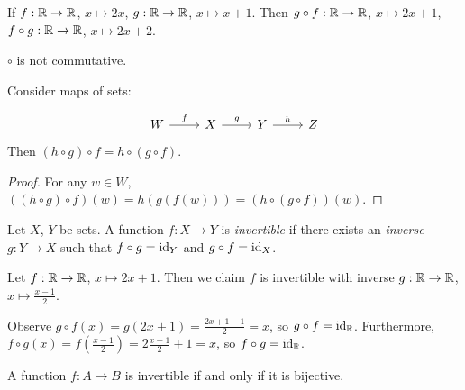 \documentclass{../../template/note}
\begin{document}
    \begin{example}
        If \(f: \mathbb R \to \mathbb R\), \(x \mapsto 2x\), \(g: \mathbb R \to \mathbb R\), \(x \mapsto x+1\). Then \(g \circ f: \mathbb R \to \mathbb R\), \(x \mapsto 2x + 1\), \(f \circ g: \mathbb R \to \mathbb R\), \(x \mapsto 2x + 2\).
    \end{example}
    
    \begin{remark*}
        \(\circ\) is not commutative.
    \end{remark*}
    
    \begin{lemma}
        Consider maps of sets:

        \[\begin{tikzcd}
            W & X & Y & Z
            \arrow["f", from=1-1, to=1-2]
            \arrow["g", from=1-2, to=1-3]
            \arrow["h", from=1-3, to=1-4]
        \end{tikzcd}\]
        Then \((h \circ g) \circ f = h \circ (g \circ f)\).
        \label{associativity-of-function-composition}
    \end{lemma}
    
    \begin{proof}
        For any \(w \in W\), \(((h \circ g) \circ f)(w) = h(g(f(w))) = (h \circ (g \circ f))(w)\).
    \end{proof}

    \begin{definition}
        Let \(X\), \(Y\) be sets. A function \(f: X \to Y\) is \emph{invertible} if there exists an \emph{inverse} \(g: Y \to X\) such that \(f \circ g = \operatorname{id}_Y\) and \(g \circ f = \operatorname{id}_X\).
    \end{definition}
    
    \begin{example}
        Let \(f: \mathbb R \to \mathbb R\), \(x \mapsto 2x+1\). Then we claim \(f\) is invertible with inverse \(g: \mathbb R \to \mathbb R\), \(x \mapsto \frac{x-1}{2}\).

        Observe \(g \circ f(x) = g(2x+1) = \frac{2x+1-1}{2} = x\), so \(g \circ f = \operatorname{id}_\mathbb R\). Furthermore, \(f \circ g(x) = f(\frac{x-1}{2}) = 2\frac{x-1}{2} + 1 = x\), so \(f \circ g = \operatorname{id}_\mathbb R\).
    \end{example}
    
    \begin{theorem}
        A function \(f: A \to B\) is invertible if and only if it is bijective.
    \end{theorem}
    
\end{document}
